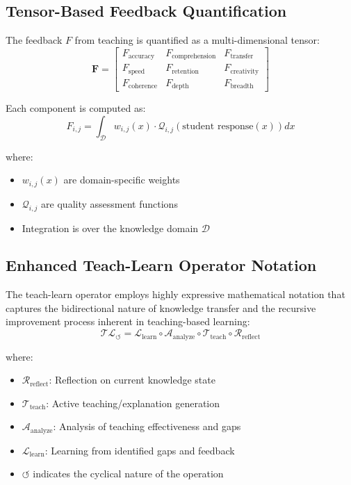 \subsection{Tensor-Based Feedback Quantification}

The feedback $F$ from teaching is quantified as a multi-dimensional tensor:
\begin{equation}
\mathbf{F} = \begin{bmatrix}
F_{\text{accuracy}} & F_{\text{comprehension}} & F_{\text{transfer}} \\
F_{\text{speed}} & F_{\text{retention}} & F_{\text{creativity}} \\
F_{\text{coherence}} & F_{\text{depth}} & F_{\text{breadth}}
\end{bmatrix}
\end{equation}

Each component is computed as:
\begin{equation}
F_{i,j} = \int_{\mathcal{D}} w_{i,j}(x) \cdot \mathcal{Q}_{i,j}(\text{student response}(x)) dx
\end{equation}

where:
\begin{itemize}
    \item $w_{i,j}(x)$ are domain-specific weights
    \item $\mathcal{Q}_{i,j}$ are quality assessment functions
    \item Integration is over the knowledge domain $\mathcal{D}$
\end{itemize}

\subsection{Enhanced Teach-Learn Operator Notation}

The teach-learn operator employs highly expressive mathematical notation that captures the bidirectional nature of knowledge transfer and the recursive improvement process inherent in teaching-based learning:
\begin{equation}
\mathcal{T}\mathcal{L}_{\circlearrowleft} = \mathcal{L}_{\text{learn}} \circ \mathcal{A}_{\text{analyze}} \circ \mathcal{T}_{\text{teach}} \circ \mathcal{R}_{\text{reflect}}
\end{equation}

where:
\begin{itemize}
    \item $\mathcal{R}_{\text{reflect}}$: Reflection on current knowledge state
    \item $\mathcal{T}_{\text{teach}}$: Active teaching/explanation generation
    \item $\mathcal{A}_{\text{analyze}}$: Analysis of teaching effectiveness and gaps
    \item $\mathcal{L}_{\text{learn}}$: Learning from identified gaps and feedback
    \item $\circlearrowleft$ indicates the cyclical nature of the operation
\end{itemize}

